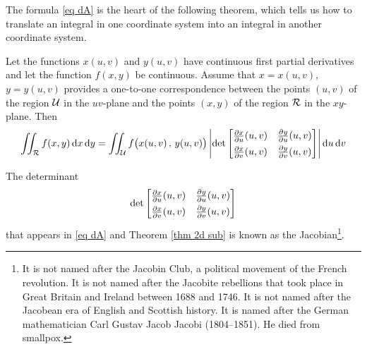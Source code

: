 The formula \eqref{eq dA} is the heart of the following theorem, which tells 
us how to translate an integral in one coordinate system into an
integral in another coordinate system.
\begin{theorem}\label{thm 2d sub}
Let the functions $x(u,v)$ and $y(u,v)$ have continuous first partial
derivatives and let the function $f(x,y)$ be continuous. Assume that
$x=x(u,v)$, $y=y(u,v)$ provides a one-to-one correspondence 
between the points $(u,v)$ of the region $\mathcal{U}$ in the $uv$-plane and 
the points $(x,y)$ of the region $\mathcal{R}$ in the $xy$-plane. Then
\begin{equation*}
\dblInt_\cR f(x,y)\,\dee{x}\,\dee{y}
 = \dblInt_{\cU} f\big(x(u,v)\,,\,y(u,v)\big) 
      \left|\det\left[\begin{matrix}
            \pdiff{x}{u}(u,v)&\pdiff{y}{u}(u,v)\\[0.05in] 
            \pdiff{x}{v}(u,v)&\pdiff{y}{v}(u,v)
       \end{matrix}\right]\right| \dee{u}\,\dee{v}
\end{equation*}

\end{theorem}

The determinant 
\begin{align*}
\det\left[\begin{matrix}
            \pdiff{x}{u}(u,v)&\pdiff{y}{u}(u,v)\\[0.05in] 
            \pdiff{x}{v}(u,v)&\pdiff{y}{v}(u,v)
       \end{matrix}\right]
\end{align*}
that appears in \eqref{eq dA} and Theorem \ref{thm 2d sub} is known as 
the Jacobian\footnote{It is not named after the Jacobin Club, a political 
movement of the French revolution. It is not named after the Jacobite rebellions that took place in Great Britain and Ireland between 1688 and 1746.
It is not named after the Jacobean era of English and Scottish history.
It is named after the German mathematician Carl Gustav Jacob Jacobi 
(1804--1851). He died from smallpox.}.

